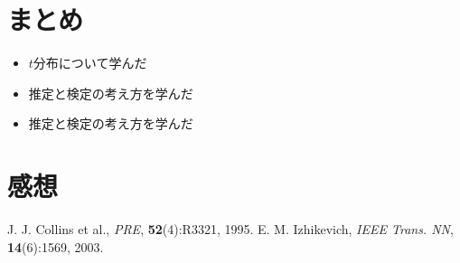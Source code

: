 \documentclass[12pt]{jarticle}
\begin{document}
\section{まとめ}
\begin{itemize}
    \item $t$分布について学んだ
    \item 推定と検定の考え方を学んだ
    \item 推定と検定の考え方を学んだ
\end{itemize}

\section{感想}

\begin{thebibliography}{99}
    \label{sannkoubunnkenn_chapter}
    J. J. Collins et al.,
    {\em PRE}, {\bf 52}(4):R3321, 1995.
     E. M. Izhikevich,
    {\em IEEE Trans. NN}, {\bf 14}(6):1569, 2003.
\end{thebibliography}

\clearpage

\appendix
\end{document}
